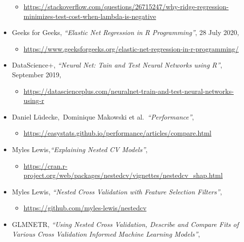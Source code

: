 \documentclass[
]{article}
\providecommand{\tightlist}{%
  \setlength{\itemsep}{0pt}\setlength{\parskip}{0pt}}
\begin{document}
\begin{itemize}
  \begin{itemize}
  \tightlist
  \item
    \url{https://stackoverflow.com/questions/26715247/why-ridge-regression-minimizes-test-cost-when-lambda-is-negative}
  \end{itemize}
\item
  Geeks for Geeks, \emph{``Elastic Net Regression in R Programming''},
  28 July 2020,

  \begin{itemize}
  \tightlist
  \item
    \url{https://www.geeksforgeeks.org/elastic-net-regression-in-r-programming/}
  \end{itemize}
\item
  DataScience+, \emph{``Neural Net: Tain and Test Neural Networks using
  R''}, September 2019,

  \begin{itemize}
  \tightlist
  \item
    \url{https://datascienceplus.com/neuralnet-train-and-test-neural-networks-using-r}
  \end{itemize}
\item
  Daniel Lüdecke,~Dominique Makowski et al.~\emph{``Performance''},

  \begin{itemize}
  \tightlist
  \item
    \url{https://easystats.github.io/performance/articles/compare.html}
  \end{itemize}
\item
  Myles Lewis,\emph{``Explaining Nested CV Models''},

  \begin{itemize}
  \tightlist
  \item
    \url{https://cran.r-project.org/web/packages/nestedcv/vignettes/nestedcv_shap.html}
  \end{itemize}
\item
  Myles Lewis, \emph{``Nested Cross Validation with Feature Selection
  Filters''},

  \begin{itemize}
  \tightlist
  \item
    \url{https://github.com/myles-lewis/nestedcv}
  \end{itemize}
\item
  GLMNETR, \emph{``Using Nested Cross Validation, Describe and Compare
  Fits of Various Cross Validation Informed Machine Learning Models''},


\end{itemize}
\end{document}
